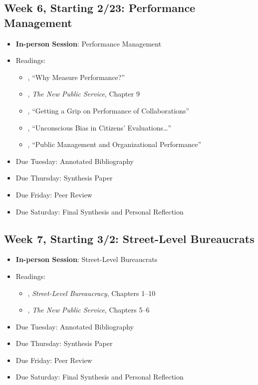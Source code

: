 \documentclass[12pt, letterpaper]{article}
\begin{document}
\subsection*{Week 6, Starting 2/23: Performance Management}
\begin{itemize}
    \item \textbf{In-person Session}: Performance Management
    \item Readings:
        \begin{itemize}
            \item \citet{Behn2003}, ``Why Measure Performance?'' 
            \item \citet{Denhardt2015}, \emph{The New Public Service}, Chapter 9 
            \item \citet{douglas2021}, ``Getting a Grip on Performance of Collaborations'' 
            \item \citet{marvel2015}, ``Unconscious Bias in Citizens' Evaluations\dots'' 
            \item \citet{nicholson-crotty2004}, ``Public Management and Organizational Performance'' 
        \end{itemize}
    \item Due Tuesday: Annotated Bibliography
    \item Due Thursday: Synthesis Paper
    \item Due Friday: Peer Review
    \item Due Saturday: Final Synthesis and Personal Reflection
\end{itemize}

\subsection*{Week 7, Starting 3/2: Street-Level Bureaucrats}
\begin{itemize}
    \item \textbf{In-person Session}: Street-Level Bureaucrats
    \item Readings:
        \begin{itemize}
            \item \citet{Lipsky2010}, \emph{Street-Level Bureaucracy}, Chapters 1--10 
            \item \citet{Denhardt2015}, \emph{The New Public Service}, Chapters 5--6 
        \end{itemize}
    \item Due Tuesday: Annotated Bibliography
    \item Due Thursday: Synthesis Paper
    \item Due Friday: Peer Review
    \item Due Saturday: Final Synthesis and Personal Reflection
\end{itemize}
\end{document}
